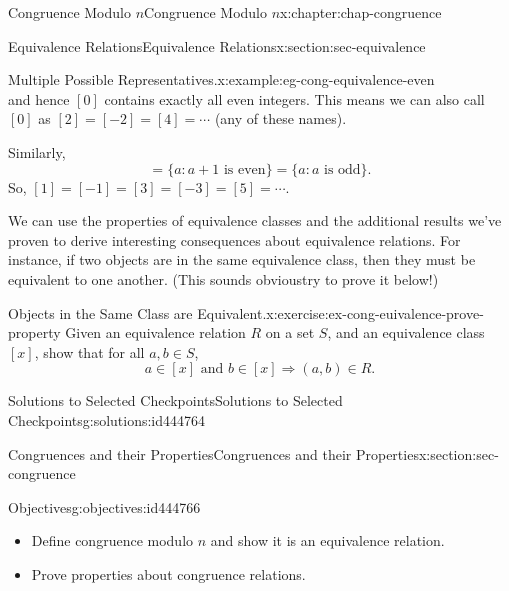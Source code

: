 \documentclass[oneside,10pt,]{book}
\numberwithin{equation}{section}
\begin{document}
\begin{chapterptx}{Congruence Modulo \(n\)}{}{Congruence Modulo \(n\)}{}{}{x:chapter:chap-congruence}
\begin{sectionptx}{Equivalence Relations}{}{Equivalence Relations}{}{}{x:section:sec-equivalence}
\begin{example}{Multiple Possible Representatives.}{x:example:eg-cong-equivalence-even}
\begin{equation*}
\end{equation*}
and hence \([0]\) contains exactly all even integers. This means we can also call \([0]\) as \([2] = [-2] = [4] = \cdots\) (any of these names).%
\par
Similarly,%
\begin{equation*}
[1] = \{a : a + 1 \text{ is even}\} = \{ a : a \text{ is odd}\}\text{.}
\end{equation*}
So, \([1] = [-1] = [3] = [-3] = [5] = \cdots\).%
\end{example}
We can use the properties of equivalence classes and the additional results we've proven to derive interesting consequences about equivalence relations. For instance, if two objects are in the same equivalence class, then they must be equivalent to one another. (This sounds obvious\textemdash{}try to prove it below!)%
\begin{inlineexercise}{Objects in the Same Class are Equivalent.}{x:exercise:ex-cong-euivalence-prove-property}%
Given an equivalence relation \(R\) on a set \(S\), and an equivalence class \([x]\), show that for all \(a, b \in S\),%
\begin{equation*}
a \in [x] \text{ and } b \in [x] \Rightarrow (a,b) \in R\text{.}
\end{equation*}
%
\end{inlineexercise}
%
%
\typeout{************************************************}
\typeout{************************************************}
%
\begin{solutions-subsection}{Solutions to Selected Checkpoints}{}{Solutions to Selected Checkpoints}{}{}{g:solutions:id444764}
\end{solutions-subsection}
\end{sectionptx}
%
%
\typeout{************************************************}
\typeout{************************************************}
%
\begin{sectionptx}{Congruences and their Properties}{}{Congruences and their Properties}{}{}{x:section:sec-congruence}
\begin{objectives}{Objectives}{g:objectives:id444766}
%
\begin{itemize}[label=\textbullet]
\item{}Define congruence modulo \(n\) and show it is an equivalence relation.%
\item{}Prove properties about congruence relations.%
\end{itemize}

\end{objectives}
\end{sectionptx}
\end{chapterptx}
\end{document}
